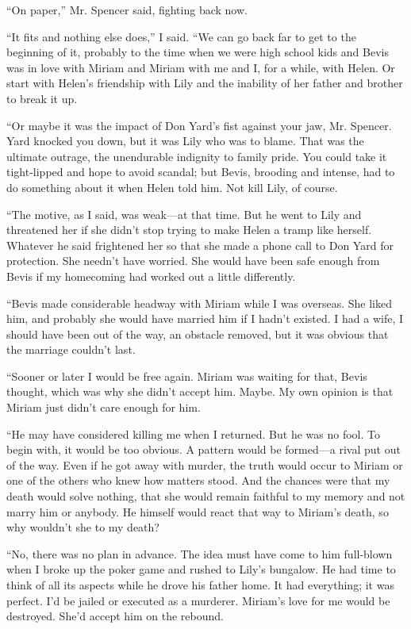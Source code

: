 \documentclass{novel}
\begin{document}
“On paper,” Mr. Spencer said, fighting back now.

\scenestars

“It fits and nothing else does,” I said. “We can go back far to get to the beginning of it, probably to the time when we were high school kids and Bevis was in love with Miriam and Miriam with me and I, for a while, with Helen. Or start with Helen’s friendship with Lily and the inability of her father and brother to break it up. 

“Or maybe it was the impact of Don Yard’s fist against your jaw, Mr. Spencer. Yard knocked you down, but it was Lily who was to blame. That was the ultimate outrage, the unendurable indignity to family pride. You could take it tight-lipped and hope to avoid scandal; but Bevis, brooding and intense, had to do something about it when Helen told him. Not kill Lily, of course. 

“The motive, as I said, was weak—at that time. But he went to Lily and threatened her if she didn’t stop trying to make Helen a tramp like herself. Whatever he said frightened her so that she made a phone call to Don Yard for protection. She needn’t have worried. She would have been safe enough from Bevis if my homecoming had worked out a little differently.

“Bevis made considerable headway with Miriam while I was overseas. She liked him, and probably she would have married him if I hadn’t existed. I had a wife, I should have been out of the way, an obstacle removed, but it was obvious that the marriage couldn’t last. 

“Sooner or later I would be free again. Miriam was waiting for that, Bevis thought, which was why she didn’t accept him. Maybe. My own opinion is that Miriam just didn’t care enough for him.

“He may have considered killing me when I returned. But he was no fool. To begin with, it would be too obvious. A pattern would be formed—a rival put out of the way. Even if he got away with murder, the truth would occur to Miriam or one of the others who knew how matters stood. And the chances were that my death would solve nothing, that she would remain faithful to my memory and not marry him or anybody. He himself would react that way to Miriam’s death, so why wouldn’t she to my death?

“No, there was no plan in advance. The idea must have come to him full-blown when I broke up the poker game and rushed to Lily’s bungalow. He had time to think of all its aspects while he drove his father home. It had everything; it was perfect. I’d be jailed or executed as a murderer. Miriam’s love for me would be destroyed. She’d accept him on the rebound. 
\end{document}
